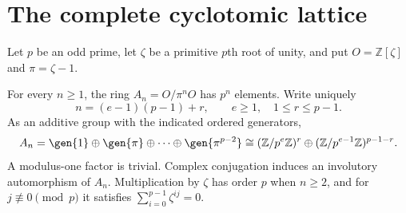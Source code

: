 \section{The complete cyclotomic lattice}
Let $p$ be an odd prime, let $\zeta$ be a primitive $p$th root of unity,
and put $O=\mathbb Z[\zeta]$ and $\pi=\zeta-1$.
\begin{theorem}\label{UF.Lattice}
For every $n\geq1$, the ring $A_n=O/\pi^nO$ has $p^n$ elements.
Write uniquely
\[
 n=(e-1)(p-1)+r,\qquad e\geq1,\quad 1\leq r\leq p-1.
\]
As an additive group with the indicated ordered generators,
\begin{equation}\label{eq:coordinates}
 A_n=\gen{1}\oplus\gen{\pi}\oplus\cdots\oplus\gen{\pi^{p-2}}
 \cong (\mathbb Z/p^e\mathbb Z)^r
 \oplus(\mathbb Z/p^{e-1}\mathbb Z)^{p-1-r}.
\end{equation}
A modulus-one factor is trivial. Complex conjugation induces an
involutory automorphism of $A_n$. Multiplication by $\zeta$ has order
$p$ when $n\geq2$, and for $j\not\equiv0\pmod p$ it satisfies
$\sum_{i=0}^{p-1}\zeta^{ij}=0$.
\end{theorem}
